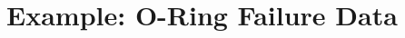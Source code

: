\documentclass[compress]{beamer}
\newcommand{\sqBullet}[1]{  {\tiny \tiny \tiny \qBoxCol{#1!60}{ }} }
\begin{document}
%
%
%
%
%
%
%
%
%
%
%
%
%
%
%
%

\section{Example: O-Ring Failure Data}
\end{document}
